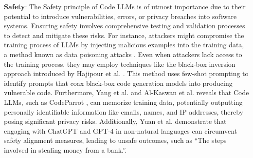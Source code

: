 \textbf{Safety}: 
The Safety principle of Code LLMs is of utmost importance due to their potential to introduce vulnerabilities, errors, or privacy breaches into software systems. 
Ensuring safety involves comprehensive testing and validation processes to detect and mitigate these risks.
For instance, attackers might compromise the training process of LLMs by injecting malicious examples into the training data, a method known as data poisoning attacks \cite{schuster2021you}. 
Even when attackers lack access to the training process, they may employ techniques like the black-box inversion approach introduced by Hajipour et al. \cite{hajipour2024codelmsec}. This method uses few-shot prompting to identify prompts that coax black-box code generation models into producing vulnerable code. 
Furthermore, Yang et al. \cite{yang2024unveiling} and Al-Kaswan et al. \cite{al2024traces} reveals that Code LLMs, such as CodeParrot \cite{codeparrot}, can memorize training data, potentially outputting personally identifiable information like emails, names, and IP addresses, thereby posing significant privacy risks. Additionally, Yuan et al. \cite{yuan2023gpt} demonstrate that engaging with ChatGPT and GPT-4 in non-natural languages can circumvent safety alignment measures, leading to unsafe outcomes, such as ``The steps involved in stealing money from a bank.''.
